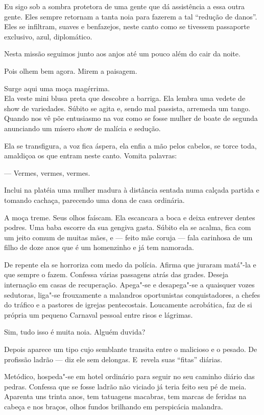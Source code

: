 Eu sigo sob a sombra protetora de uma gente que dá assistência a essa
outra gente. Eles sempre retornam a tanta noia para fazerem a tal
``redução de danos''. Eles se infiltram, suaves e benfazejos, neste
canto como se tivessem passaporte exclusivo, azul, diplomático.

Nesta missão seguimos junto aos anjos até um pouco além do cair da
noite.

\asterisc{}

Pois olhem bem agora. Mirem a paisagem.

Surge aqui uma moça magérrima.\\ Ela veste mini blusa preta que descobre
a barriga. Ela lembra uma vedete de show de variedades. Súbito se agita
e, sendo mal passista, arremeda um tango. Quando nos vê põe entusiasmo
na voz como se fosse mulher de boate de segunda anunciando um mísero
show de malícia e sedução.

Ela se transfigura, a voz fica áspera, ela enfia a mão pelos cabelos, se
torce toda, amaldiçoa os que entram neste canto. Vomita palavras:

— Vermes, vermes, vermes.

Inclui na platéia uma mulher madura à distância sentada numa calçada
partida e tomando cachaça, parecendo uma dona de casa ordinária.

A moça treme. Seus olhos faíscam. Ela escancara a boca e deixa entrever
dentes podres. Uma baba escorre da sua gengiva gasta. Súbito ela se
acalma, fica com um jeito comum de muitas mães, e --- feito mãe coruja
--- fala carinhosa de um filho de doze anos que é um homenzinho e já tem
namorada.

De repente ela se horroriza com medo da polícia. Afirma que juraram
matá"-la e que sempre o fazem. Confessa várias passagens atrás das
grades. Deseja internação em casas de recuperação. Apega"-se e
desapega"-se a quaisquer vozes sedutoras, liga"-se frouxamente a malandros
oportunistas conquistadores, a chefes do tráfico e a pastores de igrejas
pentecostais. Loucamente acrobática, faz de si própria um pequeno
Carnaval pessoal entre risos e lágrimas.

Sim, tudo isso é muita noia. Alguém duvida?

\asterisc{}

Depois aparece um tipo cujo semblante transita entre o malicioso e o
pesado. De profissão ladrão --- diz ele sem delongas. E~revela suas
``fitas'' diárias.

Metódico, hospeda"-se em hotel ordinário para seguir no seu caminho
diário das pedras. Confessa que se fosse ladrão não viciado já teria
feito seu pé de meia. Aparenta uns trinta anos, tem tatuagens macabras,
tem marcas de feridas na cabeça e nos braços, olhos fundos brilhando em
perspicácia malandra.

